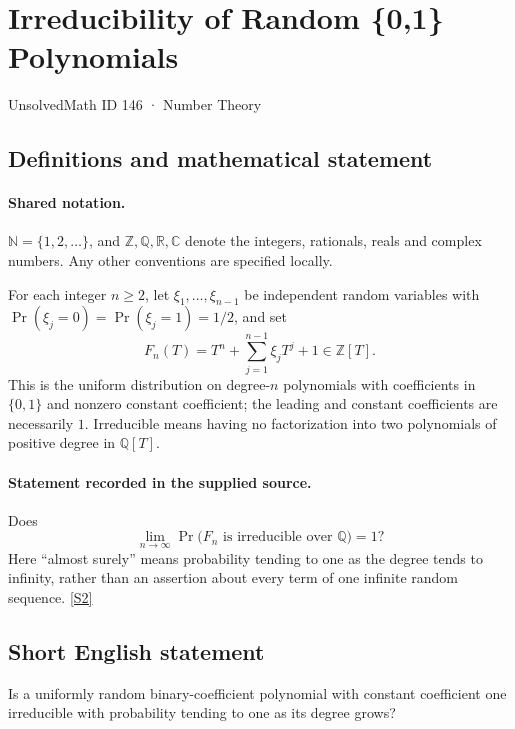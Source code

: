 \documentclass[11pt]{article}
\newcommand{\sref}[2]{\hyperlink{source:#1:#2}{[S#2]}}
\begin{document}
\setcounter{section}{145}
\section{Irreducibility of Random \{0,1\} Polynomials}\label{146}
{\small\sffamily UnsolvedMath ID 146 · Number Theory}
\subsection{Definitions and mathematical statement}

\paragraph{Shared notation.}$\mathbb N=\{1,2,\ldots\}$, and $\mathbb Z,\mathbb Q,\mathbb R,\mathbb C$ denote the integers, rationals, reals and complex numbers. Any other conventions are specified locally.


For each integer $n\geq2$, let $\xi_1,\ldots,\xi_{n-1}$ be independent random variables with
$\Pr(\xi_j=0)=\Pr(\xi_j=1)=1/2$, and set
\[
 F_n(T)=T^n+\sum_{j=1}^{n-1}\xi_jT^j+1\in\mathbb Z[T].
\]
This is the uniform distribution on degree-$n$ polynomials with coefficients in $\{0,1\}$ and nonzero constant coefficient; the leading and constant coefficients are necessarily $1$. Irreducible means having no factorization into two polynomials of positive degree in $\mathbb Q[T]$.
\paragraph{Statement recorded in the supplied source.}
Does
\[
 \lim_{n\to\infty}\Pr\bigl(F_n\text{ is irreducible over }\mathbb Q\bigr)=1?
\]
Here ``almost surely'' means probability tending to one as the degree tends to infinity, rather than an assertion about every term of one infinite random sequence. \sref{146}{2}
\subsection{Short English statement}
Is a uniformly random binary-coefficient polynomial with constant coefficient one irreducible with probability tending to one as its degree grows?
\end{document}
